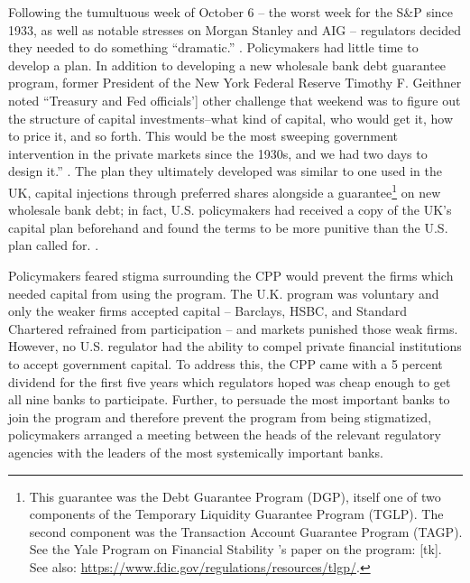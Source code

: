 \documentclass[12pt]{article}
\begin{document}
Following the tumultuous week of October 6 -- the worst week for the S\&P since 1933, as well as notable stresses on Morgan Stanley and AIG -- regulators decided they needed to do something ``dramatic.'' \citep{paulsonbook}. Policymakers had little time to develop a plan. In addition to developing a new wholesale bank debt guarantee program, former President of the New York Federal Reserve Timothy F. Geithner noted ``Treasury and Fed officials'] other challenge that weekend was to figure out the structure of capital investments--what kind of capital, who would get it, how to price it, and so forth. This would be the most sweeping government intervention in the private markets since the 1930s, and we had two days to design it.'' \citep{Geithner}. The plan they ultimately developed was similar to one used in the UK, capital injections through preferred shares alongside a guarantee\footnote{This guarantee was the Debt Guarantee Program (DGP), itself one of two components of the Temporary Liquidity Guarantee Program (TGLP). The second component was the Transaction Account Guarantee Program (TAGP). See the Yale Program on Financial Stability 's paper on the program: [tk]. See also: \url{https://www.fdic.gov/regulations/resources/tlgp/}.} on new wholesale bank debt; in fact, U.S. policymakers had received a copy of the UK's capital plan beforehand and found the terms to be more punitive than the U.S. plan called for. \citep{paulsonbook}. 

Policymakers feared stigma surrounding the CPP would prevent the firms which needed capital from using the program. The U.K. program was voluntary and only the weaker firms accepted capital -- Barclays, HSBC, and Standard Chartered refrained from participation -- and markets punished those weak firms. However, no U.S. regulator had the ability to compel private financial institutions to accept government capital. To address this, the CPP came with a 5 percent dividend for the first five years which regulators hoped was cheap enough to get all nine banks to participate. Further, to persuade the most important banks to join the program and therefore prevent the program from being stigmatized, policymakers arranged a meeting between the heads of the relevant regulatory agencies with the leaders of the most systemically important banks. 
\end{document}
